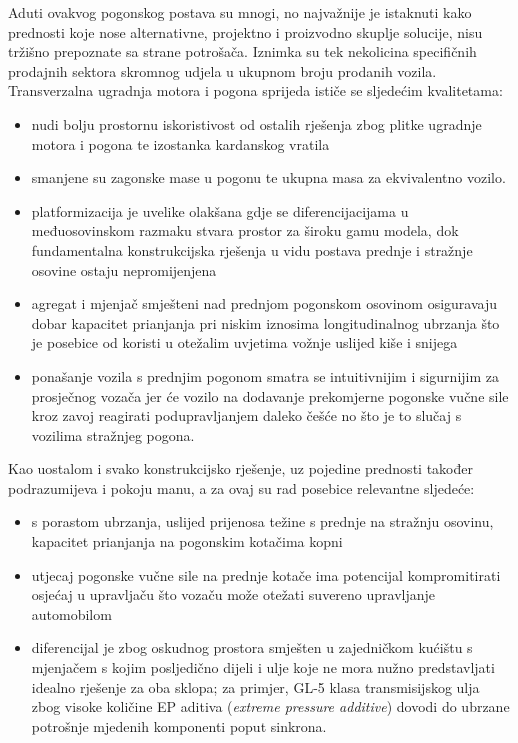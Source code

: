 \documentclass[11pt]{article}
\numberwithin{equation}{section}%
\begin{document}
Aduti ovakvog pogonskog postava su mnogi, no najvažnije je istaknuti kako prednosti koje nose alternativne, projektno i proizvodno skuplje solucije, nisu tržišno prepoznate sa strane potrošača. Iznimka su tek nekolicina specifičnih prodajnih sektora skromnog udjela u ukupnom broju prodanih vozila. Transverzalna ugradnja motora i pogona sprijeda ističe se sljedećim kvalitetama:
\begin{itemize}
\item nudi bolju prostornu iskoristivost od ostalih rješenja zbog plitke ugradnje motora i pogona te izostanka kardanskog vratila
\item smanjene su zagonske mase u pogonu te ukupna masa za ekvivalentno vozilo.
\item platformizacija je uvelike olakšana gdje se diferencijacijama u međuosovinskom razmaku stvara prostor za široku gamu modela, dok fundamentalna konstrukcijska rješenja u vidu postava prednje i stražnje osovine ostaju nepromijenjena
\item agregat i mjenjač smješteni nad prednjom pogonskom osovinom osiguravaju dobar kapacitet prianjanja pri niskim iznosima longitudinalnog ubrzanja što je posebice od koristi u otežalim uvjetima vožnje uslijed kiše i snijega
\item ponašanje vozila s prednjim pogonom smatra se intuitivnijim i sigurnijim za prosječnog vozača jer će vozilo na dodavanje prekomjerne pogonske vučne sile kroz zavoj reagirati podupravljanjem daleko češće no što je to slučaj s vozilima stražnjeg pogona.
\end{itemize}
Kao uostalom i svako konstrukcijsko rješenje, uz pojedine prednosti također podrazumijeva i pokoju manu, a za ovaj su rad posebice relevantne sljedeće:
\begin{itemize}
\item s porastom ubrzanja, uslijed prijenosa težine s prednje na stražnju osovinu, kapacitet prianjanja na pogonskim kotačima kopni
\item utjecaj pogonske vučne sile na prednje kotače ima potencijal kompromitirati osjećaj u upravljaču što vozaču može otežati suvereno upravljanje automobilom
\item diferencijal je zbog oskudnog prostora smješten u zajedničkom kućištu s mjenjačem s kojim posljedično dijeli i ulje koje ne mora nužno predstavljati idealno rješenje za oba sklopa; za primjer, GL-5 klasa transmisijskog ulja zbog visoke količine EP aditiva (\textit{extreme pressure additive}) dovodi do ubrzane potrošnje mjedenih komponenti poput sinkrona.
\end{itemize}
\end{document}
